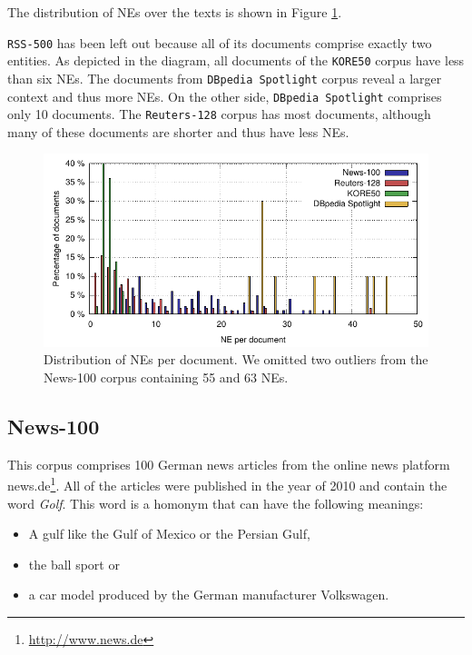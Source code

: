 The distribution of NEs over the texts is shown in Figure \ref{n3:fig:nePerDoc}. 

\texttt{RSS-500} has been left out because all of its documents comprise exactly two entities. 
As depicted in the diagram, all documents of the \texttt{KORE50} corpus have less than six NEs. 
The documents from \texttt{DBpedia Spotlight} corpus reveal a larger context and thus more NEs. 
On the other side, \texttt{DBpedia Spotlight} comprises only 10 documents.
The \texttt{Reuters-128} corpus has most documents, although many of these documents are shorter and thus have less NEs.

\begin{figure}[tb!]
  \centering
  \includegraphics[width=\linewidth]{part_02/benchmarking/LREC_N3NIFNERNED/NE_per_doc.pdf}
  \caption{Distribution of NEs per document. We omitted two outliers from the News-100 corpus containing 55 and 63 NEs.}
  \label{n3:fig:nePerDoc}
\end{figure}


\subsection{News-100}

This corpus comprises 100 German news articles from the online news platform news.de\footnote{\url{http://www.news.de}}. 
All of the articles were published in the year of 2010 and contain the word \emph{Golf}.
This word is a homonym that can have the following meanings:
\begin{itemize}
\item A gulf like the Gulf of Mexico or the Persian Gulf,
\item the ball sport or
\item a car model produced by the German manufacturer Volkswagen.
\end{itemize}

